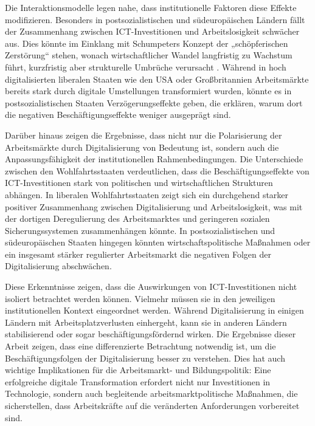 Die Interaktionsmodelle legen nahe, dass institutionelle Faktoren diese Effekte modifizieren. Besonders 
in postsozialistischen und südeuropäischen Ländern fällt der Zusammenhang zwischen 
\ac{ICT}-Investitionen und Arbeitslosigkeit schwächer aus. Dies könnte im Einklang mit Schumpeters 
Konzept der „schöpferischen Zerstörung“ stehen, wonach wirtschaftlicher Wandel langfristig zu Wachstum 
führt, kurzfristig aber strukturelle Umbrüche verursacht 
\parencite[vgl.][S. 81–86]{schumpeter1976capitalism}. Während in hoch digitalisierten liberalen Staaten 
wie den USA oder Großbritannien Arbeitsmärkte bereits stark durch digitale Umstellungen transformiert 
wurden, könnte es in postsozialistischen Staaten Verzögerungseffekte geben, die erklären, warum dort 
die negativen Beschäftigungseffekte weniger ausgeprägt sind.

Darüber hinaus zeigen die Ergebnisse, dass nicht nur die Polarisierung der Arbeitsmärkte durch 
Digitalisierung von Bedeutung ist, sondern auch die Anpassungsfähigkeit der institutionellen 
Rahmenbedingungen. Die Unterschiede zwischen den Wohlfahrtsstaaten verdeutlichen, dass die 
Beschäftigungseffekte von \ac{ICT}-Investitionen stark von politischen und wirtschaftlichen Strukturen 
abhängen. In liberalen Wohlfahrtsstaaten zeigt sich ein durchgehend starker positiver Zusammenhang 
zwischen Digitalisierung und Arbeitslosigkeit, was mit der dortigen Deregulierung des Arbeitsmarktes 
und geringeren sozialen Sicherungssystemen zusammenhängen könnte. In postsozialistischen und 
südeuropäischen Staaten hingegen könnten wirtschaftspolitische Maßnahmen oder ein insgesamt stärker 
regulierter Arbeitsmarkt die negativen Folgen der Digitalisierung abschwächen.

Diese Erkenntnisse zeigen, dass die Auswirkungen von \ac{ICT}-Investitionen nicht isoliert betrachtet 
werden können. Vielmehr müssen sie in den jeweiligen institutionellen Kontext eingeordnet werden. 
Während Digitalisierung in einigen Ländern mit Arbeitsplatzverlusten einhergeht, kann sie in anderen 
Ländern stabilisierend oder sogar beschäftigungsfördernd wirken. Die Ergebnisse dieser Arbeit zeigen, 
dass eine differenzierte Betrachtung notwendig ist, um die Beschäftigungsfolgen der Digitalisierung 
besser zu verstehen. Dies hat auch wichtige Implikationen für die Arbeitsmarkt- und Bildungspolitik: 
Eine erfolgreiche digitale Transformation erfordert nicht nur Investitionen in Technologie, sondern 
auch begleitende arbeitsmarktpolitische Maßnahmen, die sicherstellen, dass Arbeitskräfte auf die 
veränderten Anforderungen vorbereitet sind.

